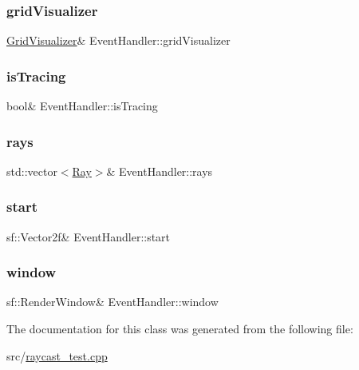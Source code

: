 \subsubsection{\texorpdfstring{grid\+Visualizer}{gridVisualizer}}
{\footnotesize\ttfamily \hyperlink{classGridVisualizer}{Grid\+Visualizer}\& Event\+Handler\+::grid\+Visualizer}

\mbox{\label{classEventHandler_a40629d2cc6371262fcf1e9fd5abb8f07}} 
\subsubsection{\texorpdfstring{is\+Tracing}{isTracing}}
{\footnotesize\ttfamily bool\& Event\+Handler\+::is\+Tracing}

\mbox{\label{classEventHandler_a9e4621f4e9ba394724a6f5b985a24a19}} 
\subsubsection{\texorpdfstring{rays}{rays}}
{\footnotesize\ttfamily std\+::vector$<$\hyperlink{classRay}{Ray}$>$\& Event\+Handler\+::rays}

\mbox{\label{classEventHandler_a119a7b2db4b9a47de6e73126910658f9}} 
\subsubsection{\texorpdfstring{start}{start}}
{\footnotesize\ttfamily sf\+::\+Vector2f\& Event\+Handler\+::start}

\mbox{\label{classEventHandler_a6dd0cfdf4535ff9aadafd17823d28709}} 
\subsubsection{\texorpdfstring{window}{window}}
{\footnotesize\ttfamily sf\+::\+Render\+Window\& Event\+Handler\+::window}



The documentation for this class was generated from the following file\+:\begin{DoxyCompactItemize}
\item 
src/\hyperlink{raycast__test_8cpp}{raycast\+\_\+test.\+cpp}\end{DoxyCompactItemize}
